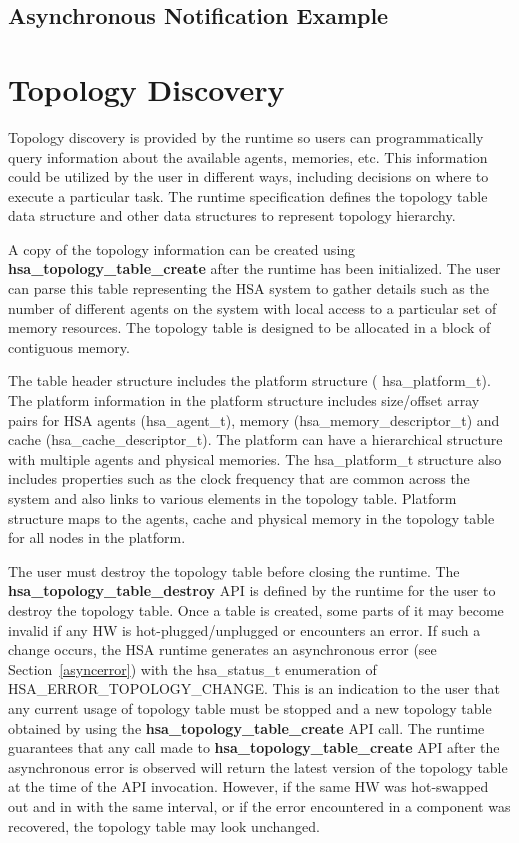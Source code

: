 \documentclass[draft]{book}
\newcommand{\mariotodo}[1]{\todo[color=CarnationPink]{#1}}
\newcommand{\reffun}[1]{\textbf{#1}}
\newcommand{\reftyp}[1]{#1}
\newcommand{\refenu}[1]{\reftyp{#1}}
\begin{document}
\subsection{Asynchronous Notification Example}


\hypertarget{component}{}\section{Topology Discovery}
\label{topology}

Topology discovery is provided by the runtime so users can programmatically
query information about the available agents, memories, etc. This information
could be utilized by the user in different ways, including decisions on where to
execute a particular task. The runtime specification defines the topology table
data structure and other data structures to represent topology hierarchy.

A copy of the topology information can be created using
\reffun{hsa_topology_table_create} after the runtime has been
initialized. The user can parse this table representing the HSA system to gather
details such as the number of different agents on the system with local access
to a particular set of memory resources. The topology table is designed to be
allocated in a block of contiguous memory.

The table header structure includes the platform structure (
\reftyp{hsa_platform_t}). The platform information in the platform structure
includes size/offset array pairs for HSA agents (\reftyp{hsa_agent_t}), memory
(\reftyp{hsa_memory_descriptor_t}) and cache
(\reftyp{hsa_cache_descriptor_t}). The platform can have a hierarchical
structure with multiple agents and physical memories. The
\reftyp{hsa_platform_t} structure also includes properties such as the clock
frequency that are common across the system and also links to various elements
in the topology table. Platform structure maps to
the agents, cache and physical memory in the topology table for all nodes in the
platform.

The user must destroy the topology table before closing the runtime. The
\reffun{hsa_topology_table_destroy} API is defined by the runtime for the
user to destroy the topology table. Once a table is created, some parts of it
may become invalid if any HW is hot-plugged/unplugged or encounters an error. If
such a change occurs, the HSA runtime generates an asynchronous error (see
Section~\ref{asyncerror}) with the \reftyp{hsa_status_t} enumeration of
\refenu{HSA_ERROR_TOPOLOGY_CHANGE}\mariotodo{never defined}. This is an
indication to the user that any current usage of topology table must be stopped
and a new topology table obtained by using the
\reffun{hsa_topology_table_create} API call. The runtime guarantees that any
call made to \reffun{hsa_topology_table_create} API after the asynchronous
error is observed will return the latest version of the topology table at the
time of the API invocation. However, if the same HW was hot-swapped out and in
with the same interval, or if the error encountered in a component was
recovered, the topology table may look unchanged.
\end{document}
